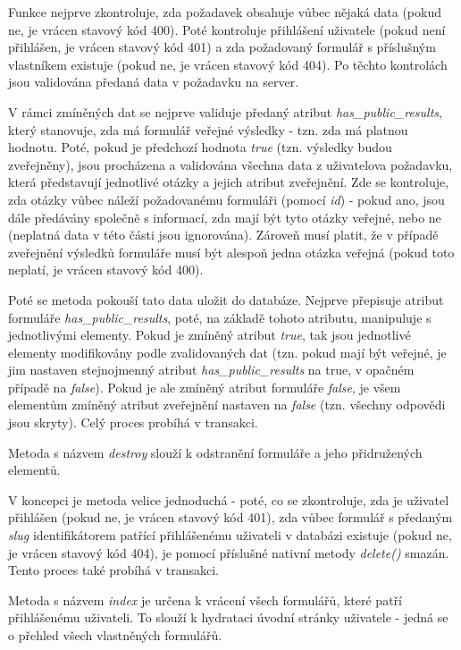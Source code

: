 			Funkce nejprve zkontroluje, zda požadavek obsahuje vůbec nějaká data (pokud ne, je vrácen stavový kód 400). Poté kontroluje přihlášení uživatele (pokud není přihlášen, je vrácen stavový kód 401) a zda požadovaný formulář s příslušným vlastníkem existuje (pokud ne, je vrácen stavový kód 404). Po těchto kontrolách jsou validována předaná data v požadavku na server.
			
			V rámci zmíněných dat se nejprve validuje předaný atribut \textit{has\_public\_results}, který stanovuje, zda má formulář veřejné výsledky - tzn. zda má platnou hodnotu. Poté, pokud je předchozí hodnota \textit{true} (tzn. výsledky budou zveřejněny), jsou procházena a validována všechna data z uživatelova požadavku, která představují jednotlivé otázky a jejich atribut zveřejnění. Zde se kontroluje, zda otázky vůbec náleží požadovanému formuláři (pomocí \textit{id}) - pokud ano, jsou dále předávány společně s informací, zda mají být tyto otázky veřejné, nebo ne (neplatná data v této části jsou ignorována). Zároveň musí platit, že v případě zveřejnění výsledků formuláře musí být alespoň jedna otázka veřejná (pokud toto neplatí, je vrácen stavový kód 400).
			
			Poté se metoda pokouší tato data uložit do databáze. Nejprve přepisuje atribut formuláře \textit{has\_public\_results}, poté, na základě tohoto atributu, manipuluje s jednotlivými elementy. Pokud je zmíněný atribut \textit{true}, tak jsou jednotlivé elementy modifikovány podle zvalidovaných dat (tzn. pokud mají být veřejné, je jim nastaven stejnojmenný atribut \textit{has\_public\_results} na true, v opačném případě na \textit{false}). Pokud je ale zmíněný atribut formuláře \textit{false}, je všem elementům zmíněný atribut zveřejnění nastaven na \textit{false} (tzn. všechny odpovědi jsou skryty). Celý proces probíhá v transakci.
			
			\label{sec:form_destroy}
			Metoda s názvem \textit{destroy} slouží k odstranění formuláře a jeho přidružených elementů.
			
			V koncepci je metoda velice jednoduchá - poté, co se zkontroluje, zda je uživatel přihlášen (pokud ne, je vrácen stavový kód 401), zda vůbec formulář s předaným \textit{slug} identifikátorem patřící přihlášenému uživateli v databázi existuje (pokud ne, je vrácen stavový kód 404), je pomocí příslušné nativní metody \textit{delete()} smazán. Tento proces také probíhá v transakci.
			
			\label{sec:form_index}
			Metoda s názvem \textit{index} je určena k vrácení všech formulářů, které patří přihlášenému uživateli. To slouží k hydrataci úvodní stránky uživatele - jedná se o přehled všech vlastněných formulářů. 
			
